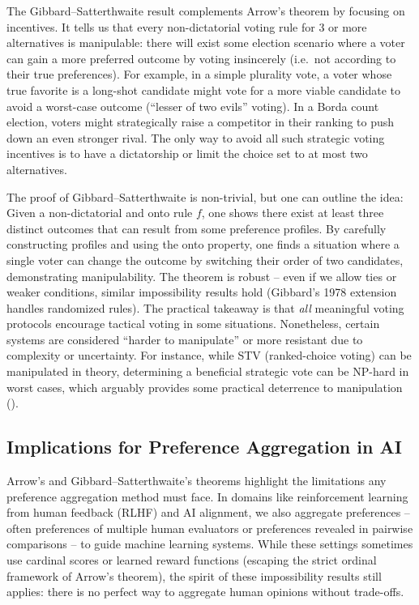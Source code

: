 \documentclass[
  letterpaper,
  numbers=noenddot,
  DIV=11]{scrreprt}
\theoremstyle{definition}
\theoremstyle{plain}
\theoremstyle{plain}
\theoremstyle{remark}
\begin{document}
The Gibbard--Satterthwaite result complements Arrow's theorem by
focusing on incentives. It tells us that every non-dictatorial voting
rule for 3 or more alternatives is manipulable: there will exist some
election scenario where a voter can gain a more preferred outcome by
voting insincerely (i.e.~not according to their true preferences). For
example, in a simple plurality vote, a voter whose true favorite is a
long-shot candidate might vote for a more viable candidate to avoid a
worst-case outcome (``lesser of two evils'' voting). In a Borda count
election, voters might strategically raise a competitor in their ranking
to push down an even stronger rival. The only way to avoid all such
strategic voting incentives is to have a dictatorship or limit the
choice set to at most two alternatives.

The proof of Gibbard--Satterthwaite is non-trivial, but one can outline
the idea: Given a non-dictatorial and onto rule \(f\), one shows there
exist at least three distinct outcomes that can result from some
preference profiles. By carefully constructing profiles and using the
onto property, one finds a situation where a single voter can change the
outcome by switching their order of two candidates, demonstrating
manipulability. The theorem is robust -- even if we allow ties or weaker
conditions, similar impossibility results hold (Gibbard's 1978 extension
handles randomized rules). The practical takeaway is that \emph{all}
meaningful voting protocols encourage tactical voting in some
situations. Nonetheless, certain systems are considered ``harder to
manipulate'' or more resistant due to complexity or uncertainty. For
instance, while STV (ranked-choice voting) can be manipulated in theory,
determining a beneficial strategic vote can be NP-hard in worst cases,
which arguably provides some practical deterrence to manipulation
().

\subsection{Implications for Preference Aggregation in
AI}\label{implications-for-preference-aggregation-in-ai}

Arrow's and Gibbard--Satterthwaite's theorems highlight the limitations
any preference aggregation method must face. In domains like
reinforcement learning from human feedback (RLHF) and AI alignment, we
also aggregate preferences -- often preferences of multiple human
evaluators or preferences revealed in pairwise comparisons -- to guide
machine learning systems. While these settings sometimes use cardinal
scores or learned reward functions (escaping the strict ordinal
framework of Arrow's theorem), the spirit of these impossibility results
still applies: there is no perfect way to aggregate human opinions
without trade-offs.
\end{document}
